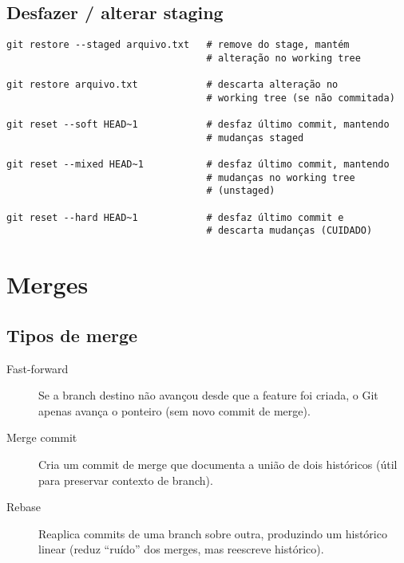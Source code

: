 \subsection{Desfazer / alterar staging}
\begin{verbatim}
git restore --staged arquivo.txt   # remove do stage, mantém
                                   # alteração no working tree

git restore arquivo.txt            # descarta alteração no
                                   # working tree (se não commitada)

git reset --soft HEAD~1            # desfaz último commit, mantendo
                                   # mudanças staged

git reset --mixed HEAD~1           # desfaz último commit, mantendo
                                   # mudanças no working tree
                                   # (unstaged)

git reset --hard HEAD~1            # desfaz último commit e 
                                   # descarta mudanças (CUIDADO)
\end{verbatim}



\section{Merges}

\subsection{Tipos de merge}
\begin{description}
  \item[Fast-forward] Se a branch destino não avançou desde que a feature foi criada, o Git apenas avança o ponteiro (sem novo commit de merge).
  \item[Merge commit] Cria um commit de merge que documenta a união de dois históricos (útil para preservar contexto de branch).
  \item[Rebase] Reaplica commits de uma branch sobre outra, produzindo um histórico linear (reduz ``ruído'' dos merges, mas reescreve histórico).
\end{description}

